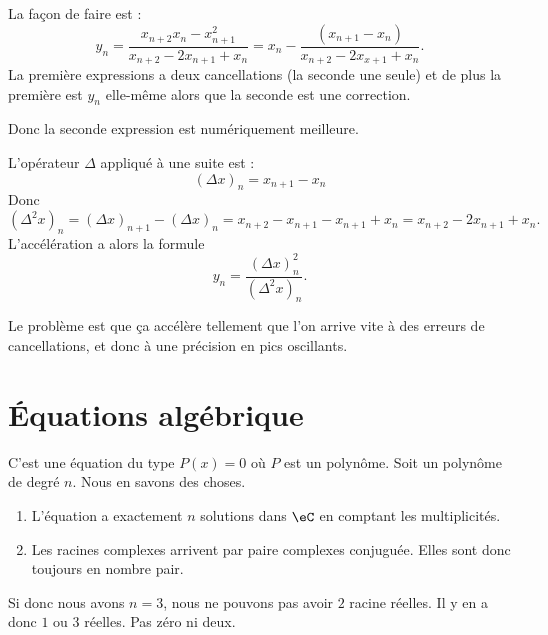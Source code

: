 La façon de faire est :
\begin{equation}
    y_n=\frac{ x_{n+2}x_n-x_{n+1}^2 }{ x_{n+2}-2x_{n+1}+x_n }=x_n-\frac{ (x_{n+1}-x_n) }{ x_{n+2}-2x_{x+1}+x_n }.
\end{equation}
La première expressions a deux cancellations (la seconde une seule) et de plus la première est $y_n$ elle-même alors que la seconde est une correction.

Donc la seconde expression est numériquement meilleure.

L'opérateur \( \Delta\) appliqué à une suite est :
\begin{equation}
    (\Delta x)_n=x_{n+1}-x_n
\end{equation}
Donc
\begin{equation}
    (\Delta^2x)_n= (\Delta x)_{n+1}-(\Delta x)_n=x_{n+2}-x_{n+1}-x_{n+1}+x_n=x_{n+2}-2x_{n+1}+x_n.
\end{equation}
L'accélération a alors la formule
\begin{equation}
    y_n=\frac{ (\Delta x)_n^2 }{ (\Delta^2x)_n }.
\end{equation}

Le problème est que ça accélère tellement que l'on arrive vite à des erreurs de cancellations, et donc à une précision en pics oscillants.

\section{Équations algébrique}

C'est une équation du type \( P(x)=0\) où \( P\) est un polynôme. Soit un polynôme de degré \( n\). Nous en savons des choses.

\begin{enumerate}
    \item
        L'équation a exactement \( n\) solutions dans \( \eC\) en comptant les multiplicités.
    \item
        Les racines complexes arrivent par paire complexes conjuguée. Elles sont donc toujours en nombre pair.
\end{enumerate}

Si donc nous avons \( n=3\), nous ne pouvons pas avoir \( 2\) racine réelles. Il y en a donc \( 1\) ou \( 3\) réelles. Pas zéro ni deux.

